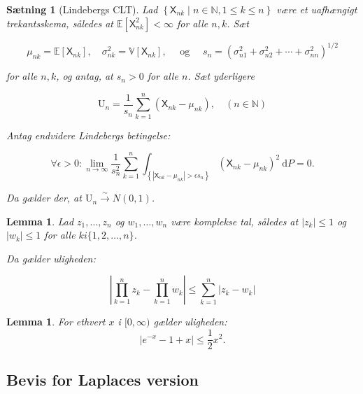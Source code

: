 \documentclass{article}
\newcommand{\1}{\mathbbm{1}}
\newcommand{\X}{\mathsf{X}}
\theoremstyle{boxed}
\newtheorem{lemma}[theorem]{Lemma}
\newtheorem{proposition}[theorem]{Sætning}
\begin{document}
\begin{theorem-box}
    \begin{proposition}[Lindebergs CLT]
        Lad $\left\{\X_{n k} \mid n \in \mathbb{N}, 1 \leq k \leq n\right\}$ være et uafhængigt trekantsskema, således at $\mathbb{E}\left[\X_{n k}^2\right]<\infty$ for alle $n, k$. Sæt

$$
\mu_{n k}=\mathbb{E}\left[\X_{n k}\right], \quad \sigma_{n k}^2=\mathbb{V}\left[\X_{n k}\right], \quad \text { og } \quad s_n=\left(\sigma_{n 1}^2+\sigma_{n 2}^2+\cdots+\sigma_{n n}^2\right)^{1 / 2}
$$

for alle $n, k$, og antag, at $s_n>0$ for alle $n$.
Sæt yderligere

$$
\mathrm{U}_n=\frac{1}{s_n} \sum_{k=1}^n\left(\X_{n k}-\mu_{n k}\right), \quad(n \in \mathbb{N})
$$


Antag endvidere Lindebergs betingelse:

$$
\forall \epsilon>0: \lim _{n \rightarrow \infty} \frac{1}{s_n^2} \sum_{k=1}^n \int_{\left\{\left|\mathsf{X}_{n k}-\mu_{n k}\right|>\epsilon s_n\right\}}\left(\X_{n k}-\mu_{n k}\right)^2 \mathrm{~d} P=0 .
$$


Da gælder der, at $\mathrm{U}_n \xrightarrow{\sim} N(0,1)$.
    \end{proposition}
\end{theorem-box}
\begin{theorem-box}
    \begin{lemma}
        Lad $z_1, \ldots, z_n$ og $w_1, \ldots, w_n$ være komplekse tal, således at $\left|z_k\right| \leq 1$ og $\left|w_k\right| \leq 1$ for alle $k i\{1,2, \ldots, n\}$.

Da gælder uligheden:

$$
\left|\prod_{k=1}^n z_k-\prod_{k=1}^n w_k\right| \leq \sum_{k=1}^n\left|z_k-w_k\right|
$$

    \end{lemma}
\end{theorem-box}
\begin{theorem-box}
    \begin{lemma}
        For ethvert $x$ i $[0,\infty)$ gælder uligheden:
        $$\left|e^{-x}-1+x\right|\leq \frac{1}{2}x^2.$$
    \end{lemma}
\end{theorem-box}
\subsection{Bevis for Laplaces version}
\end{document}
